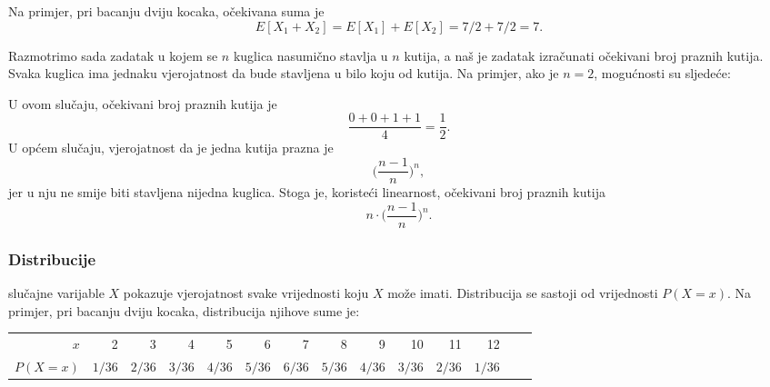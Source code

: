 Na primjer, pri bacanju dviju kocaka,
očekivana suma je
\[E[X_1+X_2]=E[X_1]+E[X_2]=7/2+7/2=7.\]

Razmotrimo sada zadatak u kojem se
$n$ kuglica nasumično stavlja u $n$ kutija,
a naš je zadatak izračunati očekivani
broj praznih kutija.
Svaka kuglica ima jednaku vjerojatnost da
bude stavljena u bilo koju od kutija.
Na primjer, ako je $n=2$, mogućnosti
su sljedeće:
\begin{center}
\end{center}
U ovom slučaju, očekivani broj
praznih kutija je
\[\frac{0+0+1+1}{4} = \frac{1}{2}.\]
U općem slučaju, vjerojatnost da je
jedna kutija prazna je
\[\Big(\frac{n-1}{n}\Big)^n,\]
jer u nju ne smije biti stavljena nijedna kuglica.
Stoga je, koristeći linearnost, očekivani broj
praznih kutija
\[n \cdot \Big(\frac{n-1}{n}\Big)^n.\]

\subsubsection{Distribucije}


 slučajne varijable $X$
pokazuje vjerojatnost svake vrijednosti koju
$X$ može imati.
Distribucija se sastoji od vrijednosti $P(X=x)$.
Na primjer, pri bacanju dviju kocaka,
distribucija njihove sume je:
\begin{center}
\small {
\begin{tabular}{r|rrrrrrrrrrrrr}
$x$ & 2 & 3 & 4 & 5 & 6 & 7 & 8 & 9 & 10 & 11 & 12 \\
$P(X=x)$ & $1/36$ & $2/36$ & $3/36$ & $4/36$ & $5/36$ & $6/36$ & $5/36$ & $4/36$ & $3/36$ & $2/36$ & $1/36$ \\
\end{tabular}
}
\end{center}

